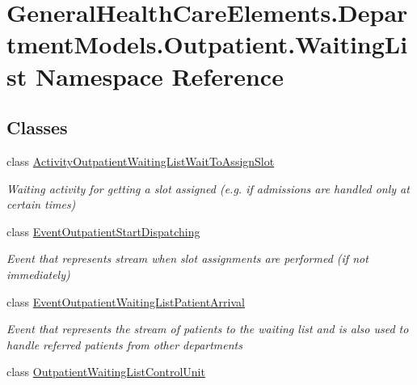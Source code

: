 \hypertarget{namespace_general_health_care_elements_1_1_department_models_1_1_outpatient_1_1_waiting_list}{}\section{General\+Health\+Care\+Elements.\+Department\+Models.\+Outpatient.\+Waiting\+List Namespace Reference}
\label{namespace_general_health_care_elements_1_1_department_models_1_1_outpatient_1_1_waiting_list}
\subsection*{Classes}
\begin{DoxyCompactItemize}
\item 
class \hyperlink{class_general_health_care_elements_1_1_department_models_1_1_outpatient_1_1_waiting_list_1_1_act8586a0b22c75d36396c6c75291998c21}{Activity\+Outpatient\+Waiting\+List\+Wait\+To\+Assign\+Slot}
\begin{DoxyCompactList}\small\item\em Waiting activity for getting a slot assigned (e.\+g. if admissions are handled only at certain times) \end{DoxyCompactList}\item 
class \hyperlink{class_general_health_care_elements_1_1_department_models_1_1_outpatient_1_1_waiting_list_1_1_event_outpatient_start_dispatching}{Event\+Outpatient\+Start\+Dispatching}
\begin{DoxyCompactList}\small\item\em Event that represents stream when slot assignments are performed (if not immediately) \end{DoxyCompactList}\item 
class \hyperlink{class_general_health_care_elements_1_1_department_models_1_1_outpatient_1_1_waiting_list_1_1_eveb69cba3dbb99690008a282b7e42002d2}{Event\+Outpatient\+Waiting\+List\+Patient\+Arrival}
\begin{DoxyCompactList}\small\item\em Event that represents the stream of patients to the waiting list and is also used to handle referred patients from other departments \end{DoxyCompactList}\item 
class \hyperlink{class_general_health_care_elements_1_1_department_models_1_1_outpatient_1_1_waiting_list_1_1_out0eb5e03b9183fdbdabb1cbe4530cecf4}{Outpatient\+Waiting\+List\+Control\+Unit}

\end{DoxyCompactItemize}
